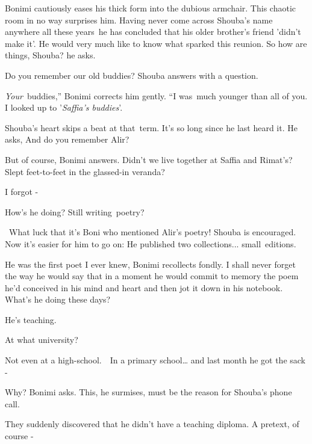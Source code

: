\documentclass[twoside,11pt]{book}
\begin{document}
Bonimi cautiously eases his thick form into the dubious armchair. This chaotic room in no way surprises him. Having
never come across Shouba's name anywhere all these years\ he has concluded that his older brother's friend {}'didn't
make it{}'. He would very much like to know what sparked this reunion. {\textquotedbl}So how are things,
Shouba?{\textquotedbl} he asks.

{\textquotedbl}Do you remember our old buddies?{\textquotedbl} Shouba answers with a question.

{\textquotedbl}\textit{Your}~buddies,'' Bonimi corrects him gently. ``I was~much younger than all of you. I looked up to
'\textit{Saffia's buddies}{}'.{\textquotedbl} 

Shouba's heart skips a beat at that\ term. It's so long since he last heard it. He asks, {\textquotedbl}And do you
remember Alir?{\textquotedbl}

{\textquotedbl}But of course,{\textquotedbl} Bonimi answers. {\textquotedbl}Didn't we live together at Saffia and
Rimat's? Slept feet-to-feet in the glassed-in veranda?{\textquotedbl} 

{\textquotedbl}I forgot -{\textquotedbl} 

{\textquotedbl}How's he doing? Still writing~poetry?{\textquotedbl}

~What luck that it{}'s Boni who mentioned Alir's poetry! Shouba is encouraged. Now it's easier for him to go on:
{\textquotedbl}He published two collections...
small{\ }editions.{\textquotedbl}

{\textquotedbl}He was the first poet I ever knew,{\textquotedbl} Bonimi recollects fondly. {\textquotedbl}I shall never
forget the way he would say that in a moment he would commit to memory the poem he'd conceived in his mind and heart
and then jot it down in his notebook. What's he doing these days?{\textquotedbl}

{\textquotedbl}He's teaching.{\textquotedbl}\ 

{\textquotedbl}At what university?{\textquotedbl}

{\textquotedbl}Not even {at} a high-school.{\ \ }{In a} primary
school{\dots} and last month he got the sack -{\textquotedbl} 

{\textquotedbl}Why?{\textquotedbl} Bonimi asks. This, he surmises, must be the reason for Shouba's phone call.\ 

{\textquotedbl}They suddenly discovered that he didn't have a teaching diploma. A pretext, of course -{\textquotedbl}
\end{document}

